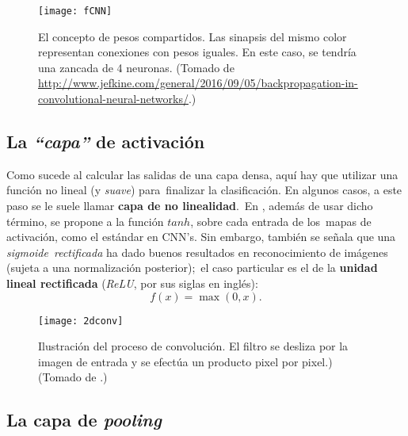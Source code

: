 \begin{figure}
  \centering
  \texttt{[image: fCNN]}
  \caption{El concepto de pesos compartidos. Las sinapsis del mismo color representan conexiones con pesos iguales.
    En este caso, se tendría una zancada de 4 neuronas.
    (Tomado de \url{http://www.jefkine.com/general/2016/09/05/backpropagation-in-convolutional-neural-networks/}.)}
  \label{fCNN_fig}
\end{figure}

\subsection{La \emph{``capa''} de activación}

\noindent
Como sucede al calcular las salidas de una capa densa, aquí hay que utilizar una función no lineal (y \emph{suave}) para\
finalizar la clasificación. En algunos casos, a este paso se le suele llamar \textbf{capa de no linealidad}.\
En \cite{lecun2010}, además de usar dicho término, se propone a la función $tanh$, sobre cada entrada de los\
mapas de activación, como el estándar en CNN's. Sin embargo, también se señala que una \emph{sigmoide}\
\emph{rectificada} ha dado buenos resultados en reconocimiento de imágenes (sujeta a una normalización posterior);\
el caso particular es el de la \textbf{unidad lineal rectificada} (\emph{ReLU}, por sus siglas en inglés):
\begin{equation}
  f(x) = \max(0, x).
\end{equation}

\begin{figure}
  \centering
  \texttt{[image: 2dconv]}
  \caption{Ilustración del proceso de convolución. El filtro se desliza por la imagen de entrada y
    se efectúa un producto pixel por pixel.)
    (Tomado de \cite{goodfellow-et-al-2016}.)}
  \label{2dconv_fig}
\end{figure}

\subsection{La capa de \emph{pooling}}

